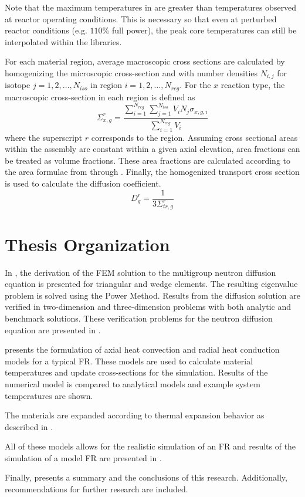   Note that the maximum temperatures in  are greater than 
  temperatures observed at reactor operating conditions. This is necessary so 
  that even at perturbed reactor conditions (e.g. $110\%$ full power), the peak 
  core temperatures can still be interpolated within the libraries.

  For each material region, average macroscopic cross
  sections are calculated by homogenizing the microscopic cross-section and with 
  number densities $N_{i,j}$ for isotope ${j=1,2,\ldots,N_{iso}}$ in region
  ${i=1,2,\ldots,N_{reg}}$.  For the $x$ reaction type, the 
  macroscopic cross-section in each region is defined as
  \begin{equation}
    \Sigma_{x,g}^r = \frac{\sum_{i=1}^{N_{reg}} \sum_{j=1}^{N_{iso}} V_i N_{j} 
      \sigma_{x,g,i}} {\sum_{i=1}^{N_{reg}}V_i}
  \end{equation}
  where the superscript $r$ corresponds to the region. Assuming cross sectional
  areas within the assembly are constant within a given axial elevation, area
  fractions can be treated as volume fractions. These area fractions are
  calculated according to the area formulae from  through
  . Finally, the homogenized transport cross section is used 
  to calculate the diffusion coefficient.
  \begin{equation}
    D_g^r = \frac{1}{3 \Sigma_{tr,g}^r}
  \end{equation}

\section{Thesis Organization}
  In , the derivation of the FEM solution to the
  multigroup neutron diffusion equation is
  presented for triangular and wedge elements. The resulting eigenvalue problem
  is solved using the Power Method. Results from the diffusion solution are
  verified in two-dimension and three-dimension problems with both analytic and
  benchmark solutions. These verification problems for the neutron diffusion
  equation are presented in .

   presents the formulation of axial heat convection
  and radial heat conduction models for a typical FR. These models are used to
  calculate material temperatures and update cross-sections for the simulation.
  Results of the numerical model is compared to analytical models and example
  system temperatures are shown.

  The materials are expanded according to thermal expansion behavior as
  described in . 
  
  All of these models allows for the realistic
  simulation of an FR and results of the simulation of a model FR are presented
  in .
 
  Finally,  presents a 
  summary and the conclusions of this research. Additionally, recommendations 
  for further research are included.

